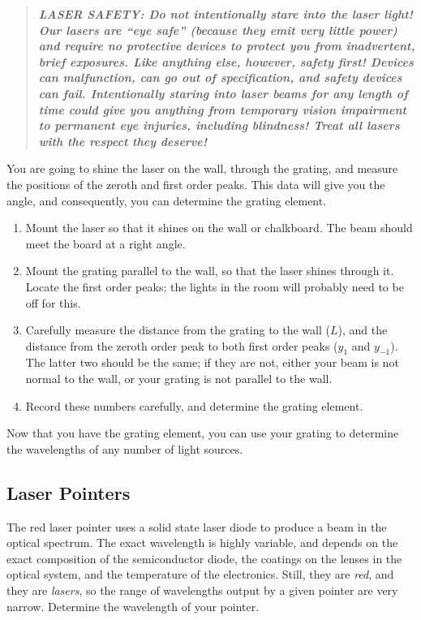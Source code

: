 \documentclass[12pt]{article}
\begin{document}
\begin{quote}
  \textbf{\textit{LASER SAFETY: Do not intentionally stare into the
      laser light!  Our lasers are ``eye safe'' (because they emit
      very little power) and require no protective devices to protect
      you from inadvertent, brief exposures.  Like anything else,
      however, safety first!  Devices can malfunction, can go out of
      specification, and safety devices can fail.  Intentionally
      staring into laser beams for any length of time could give you
      anything from temporary vision impairment to permanent eye
      injuries, including blindness!  Treat all lasers with the
      respect they deserve!}}
\end{quote}

You are going to shine the laser on the wall, through the grating, and
measure the positions of the zeroth and first order peaks.  This data
will give you the angle, and consequently, you can determine the
grating element.
\begin{enumerate}
\item Mount the laser so that it shines on the wall or chalkboard.
  The beam should meet the board at a right angle.
\item Mount the grating parallel to the wall, so that the laser shines
  through it.  Locate the first order peaks; the lights in the room
  will probably need to be off for this.
\item Carefully measure the distance from the grating to the wall
  ($L$), and the distance from the zeroth order peak to both first
  order peaks ($y_1$ and $y_{-1}$).  The latter two should be the
  same; if they are not, either your beam is not normal to the wall,
  or your grating is not parallel to the wall.  
\item Record these numbers carefully, and determine the grating
  element. 
\end{enumerate}

Now that you have the grating element, you can use your grating to
determine the wavelengths of any number of light sources.

\subsection{Laser Pointers}
\label{sec:pointers}

The red laser pointer uses a solid state laser diode to produce a beam
in the optical spectrum.  The exact wavelength is highly variable, and
depends on the exact composition of the semiconductor diode, the
coatings on the lenses in the optical system, and the temperature of
the electronics.  Still, they are \textit{red}, and they are
\textit{lasers}, so the range of wavelengths output by a given pointer
are very narrow.  Determine the wavelength of your pointer.
\end{document}
